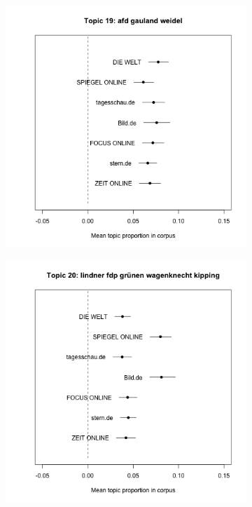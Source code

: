 \documentclass[12pt,a4paper,notitlepage]{article}
\begin{document}
\begin{figure}[H]
\begin{center}
\begin{subfigure}[normla]{0.2\textwidth}
		\end{subfigure}
		\begin{subfigure}[normla]{0.2\textwidth}
			\includegraphics[width=\textwidth]{../figs/estimate_effect19.png}
		\end{subfigure}
		\begin{subfigure}[normla]{0.2\textwidth}
			\includegraphics[width=\textwidth]{../figs/estimate_effect20.png}

\end{subfigure}
\end{center}
\end{figure}
\end{document}
